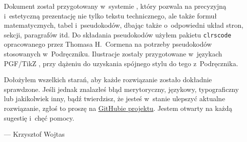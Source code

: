 Dokument został przygotowany w~systemie \LaTeXe, który pozwala na precyzyjną i~estetyczną prezentację nie tylko tekstu technicznego, ale także formuł matematycznych, tabel i~pseudokodów, dbając także o~odpowiedni układ stron, sekcji, paragrafów itd.
Do składania pseudokodów użyłem pakietu \texttt{clrscode} opracowanego przez Thomasa H.\ Cormena na potrzeby pseudokodów stosowanych w~Podręczniku.
Ilustracje zostały przygotowane w~językach PGF/TikZ \cite{pgfmanual}, przy dążeniu do uzyskania spójnego stylu do tego z~Podręcznika.

Dołożyłem wszelkich starań, aby każde rozwiązanie zostało dokładnie sprawdzone.
Jeśli jednak znalazłeś błąd merytoryczny, językowy, typograficzny lub jakikolwiek inny, bądź twierdzisz, że jesteś w~stanie ulepszyć aktualne rozwiązanie, zgłoś to proszę na \href{https://github.com/wojtask/CormenSol/issues/new}{GitHubie projektu}.
Jestem otwarty na każdą sugestię i~chęć pomocy.

\bigskip
\bigskip
{}\hfill--- Krzysztof Wojtas

